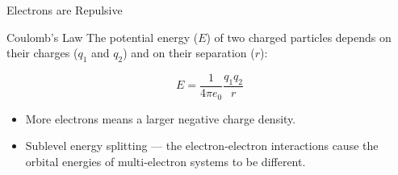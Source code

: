 \documentclass[notes=show]{beamer}
\begin{document}
%


\begin{frame}{Electrons are Repulsive}
	\begin{block}{Coulomb's Law}
		The potential energy ($E$) of two charged particles depends on
		their charges ($q_1$ and $q_2$) and on their separation ($r$):

		\begin{equation*}
			E = \frac{1}{4\pi e_0} \frac{q_1 q_2}{r}
		\end{equation*}
	\end{block}

	\begin{itemize}[<+->]
		\item More electrons means a larger negative charge density.
		\item \alert{Sublevel energy splitting} --- the electron-electron
			interactions cause the orbital energies of
			multi-electron systems to be different.
	\end{itemize}
\end{frame}
\end{document}
